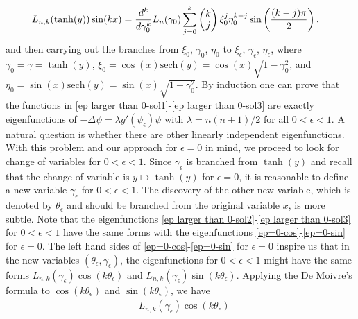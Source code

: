 \documentclass[1 [leqno, 11pt]{amsart}
\numberwithin{equation}{section}
\let\ep=\epsilon
\begin{document}
\begin{CJK*}{GBK}{song}
\begin{align}
 &L_{n,k}(\tanh(y))\sin(kx)=
 {d^k\over d\gamma_0^k}L_n(\gamma_0)
 \sum_{j=0}^k\begin{pmatrix}k\\j\end{pmatrix}\xi_0^j\eta_0^{k-j}\sin\left({(k-j)\pi\over2}\right),
\end{align}
and then carrying out the branches from $\xi_0$, $\gamma_0$, $\eta_0$ to $\xi_\ep$, $\gamma_\ep$, $\eta_\ep$,
where $\gamma_0=\gamma=\tanh(y)$,  $\xi_0=\cos(x)\text{sech}(y)=\cos(x)\sqrt{1-\gamma_0^2}$, and $\eta_0=\sin(x)\text{sech}(y)=\sin(x)\sqrt{1-\gamma_0^2}$.
By induction one can prove that   the functions in \eqref{ep larger than 0-sol1}-\eqref{ep larger than 0-sol3} are exactly  eigenfunctions of $
-\Delta \psi = \lambda g'(\psi_\epsilon)\psi
$ with $\lambda=n(n+1)/2$ for all $0<\epsilon<1$.
A natural question is whether there are  other linearly independent eigenfunctions.
With this problem  and our approach for $\ep=0$ in mind, we proceed to look for  change of variables for $0<\ep<1$.
Since $\gamma_\ep$ is branched from $\tanh(y)$ and recall that the change of variable is $y\mapsto \tanh(y)$ for $\ep=0$,  it is reasonable to define a new variable $\gamma_\ep$  for $0<\ep<1$.
The discovery of the other new variable, which is denoted by $\theta_\epsilon$ and should be branched  from the original variable $x$, is more subtle. Note that the eigenfunctions  \eqref{ep larger than 0-sol2}-\eqref{ep larger than 0-sol3} for  $0<\ep<1$  have the same forms with the eigenfunctions  \eqref{ep=0-cos}-\eqref{ep=0-sin} for $\ep=0$. The left hand sides of  \eqref{ep=0-cos}-\eqref{ep=0-sin}  for $\ep=0$ inspire us that  in the new variables $(\theta_\ep,\gamma_\ep)$,   the eigenfunctions for $0<\ep<1$ might  have the same forms
  $L_{n,k}(\gamma_\epsilon)\cos(k\theta_\epsilon)$  and $L_{n,k}(\gamma_\epsilon)\sin(k\theta_\epsilon)$. Applying the De Moivre's formula to $\cos(k\theta_\epsilon)$  and $\sin(k\theta_\epsilon)$, we have
 \begin{align}\nonumber
&L_{n,k}(\gamma_\epsilon)\cos(k\theta_\epsilon)\\\label{eigen-ep-gamma-theta1}

\end{align}
\end{CJK*}
\end{document}
